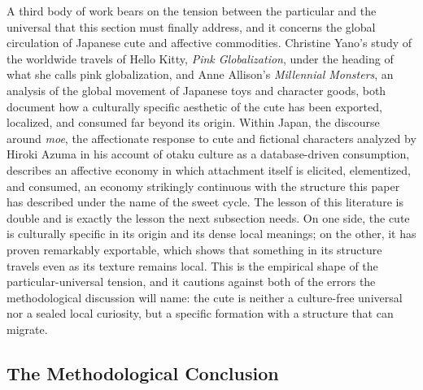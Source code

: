 \documentclass[11pt,a4paper]{article}
\begin{document}
A third body of work bears on the tension between the particular and the universal that this section must finally address, and it concerns the global circulation of Japanese cute and affective commodities. Christine Yano's study of the worldwide travels of Hello Kitty, \textit{Pink Globalization}, under the heading of what she calls pink globalization, and Anne Allison's \textit{Millennial Monsters}, an analysis of the global movement of Japanese toys and character goods, both document how a culturally specific aesthetic of the cute has been exported, localized, and consumed far beyond its origin. Within Japan, the discourse around \textit{moe}, the affectionate response to cute and fictional characters analyzed by Hiroki Azuma in his account of otaku culture as a database-driven consumption, describes an affective economy in which attachment itself is elicited, elementized, and consumed, an economy strikingly continuous with the structure this paper has described under the name of the sweet cycle. The lesson of this literature is double and is exactly the lesson the next subsection needs. On one side, the cute is culturally specific in its origin and its dense local meanings; on the other, it has proven remarkably exportable, which shows that something in its structure travels even as its texture remains local. This is the empirical shape of the particular-universal tension, and it cautions against both of the errors the methodological discussion will name: the cute is neither a culture-free universal nor a sealed local curiosity, but a specific formation with a structure that can migrate.

\subsection{The Methodological Conclusion}
\end{document}
